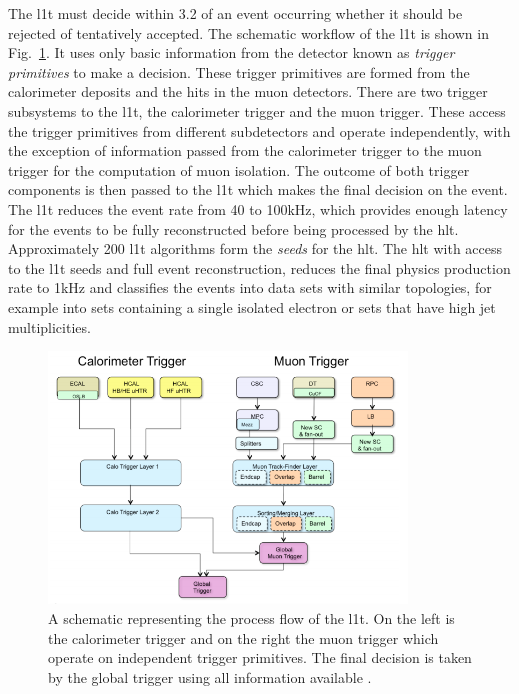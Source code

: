The \acrshort{l1t} must decide within 3.2\us{} of an event occurring whether it should be rejected of tentatively accepted.
The schematic workflow of the \acrshort{l1t} is shown in Fig.~\ref{fig:CMSL1T}.
It uses only basic information from the detector known as \textit{trigger primitives} to make a decision.
These trigger primitives are formed from the calorimeter deposits and the hits in the muon detectors.
There are two trigger subsystems to the \acrshort{l1t}, the calorimeter trigger and the muon trigger.
These access the trigger primitives from different subdetectors and operate independently, with the exception of information passed from the calorimeter trigger to the muon trigger for the computation of muon isolation.
The outcome of both trigger components is then passed to the \acrshort{l1t} which makes the final decision on the event.
The \acrshort{l1t} reduces the event rate from 40\MHz{} to 100\unit{kHz}, which provides enough latency for the events to be fully reconstructed before being processed by the \acrshort{hlt}. 
Approximately 200 \acrshort{l1t} algorithms form the \textit{seeds} for the \acrshort{hlt}. 
The \acrshort{hlt} with access to the \acrshort{l1t} seeds and full event reconstruction, reduces the final physics production rate to 1\unit{kHz} and classifies the events into data sets with similar topologies, for example into sets containing a single isolated electron or sets that have high jet multiplicities.
\begin{figure}[htpb]
	\centering
	\includegraphics[width=0.85\textwidth]{Figures/CMSL1TUpgrade}
	\caption[A schematic representing the process flow of the \acrshort{l1t}. On the left is the calorimeter trigger and on the right the muon trigger which operate on independent trigger primitives. The final decision is taken by the global trigger using all information available.]{A schematic representing the process flow of the \acrshort{l1t}. On the left is the calorimeter trigger and on the right the muon trigger which operate on independent trigger primitives. The final decision is taken by the global trigger using all information available \cite{CMS:L1TUpgradeTDR}.}
	\label{fig:CMSL1T}
\end{figure}

